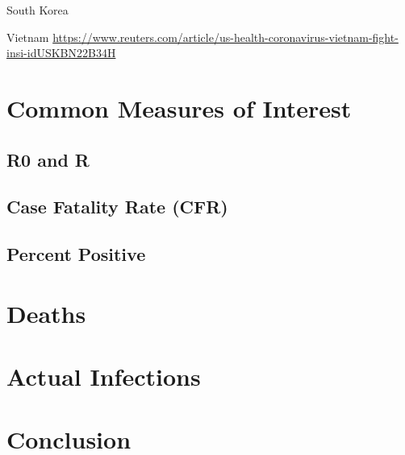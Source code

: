 \documentclass[
]{book}
\begin{document}
South Korea

Vietnam
\url{https://www.reuters.com/article/us-health-coronavirus-vietnam-fight-insi-idUSKBN22B34H}

\hypertarget{common-measures-of-interest}{%
\chapter{Common Measures of Interest}\label{common-measures-of-interest}}

\hypertarget{r0-and-r}{%
\section{R0 and R}\label{r0-and-r}}

\hypertarget{case-fatality-rate-cfr}{%
\section{Case Fatality Rate (CFR)}\label{case-fatality-rate-cfr}}

\hypertarget{percent-positive}{%
\section{Percent Positive}\label{percent-positive}}

\hypertarget{deaths}{%
\chapter{Deaths}\label{deaths}}

\hypertarget{actual-infections}{%
\chapter{Actual Infections}\label{actual-infections}}

\hypertarget{conclusion}{%
\chapter{Conclusion}\label{conclusion}}

  
\end{document}
